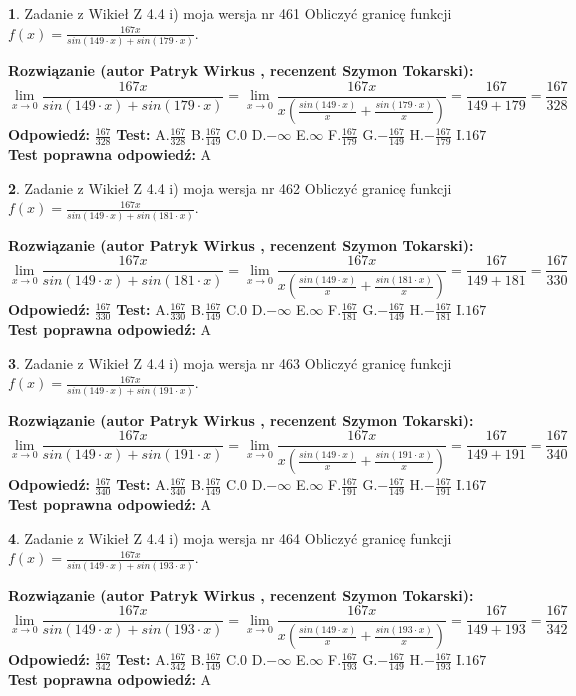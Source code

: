 \documentclass[12pt, a4paper]{article}
\theoremstyle{definition} %
\newtheorem{zad}{}
\newcommand{\zadStart}[1]{\begin{zad}#1\newline}
\newcommand{\zadStop}{\end{zad}}
\newcommand{\rozwStart}[2]{\noindent \textbf{Rozwiązanie (autor #1 , recenzent #2): }\newline}
\newcommand{\rozwStop}{\newline}
\newcommand{\odpStart}{\noindent \textbf{Odpowiedź:}\newline}
\newcommand{\odpStop}{\newline}
\newcommand{\testStart}{\noindent \textbf{Test:}\newline}
\newcommand{\testStop}{\newline}
\newcommand{\kluczStart}{\noindent \textbf{Test poprawna odpowiedź:}\newline}
\newcommand{\kluczStop}{\newline}
\begin{document}
\zadStart{Zadanie z Wikieł Z 4.4 i) moja wersja nr 461}
Obliczyć granicę funkcji $f(x)=\frac{167x}{sin(149\cdot x) +sin(179\cdot x)}$.
\zadStop
\rozwStart{Patryk Wirkus}{Szymon Tokarski}
$$\lim\limits_{x\to 0}\frac{167x}{sin(149\cdot x) +sin(179\cdot x)}=\lim\limits_{x\to 0}\frac{167x}{x(\frac{sin(149\cdot x)}{x}+\frac{sin(179\cdot x)}{x})}=\frac{167}{149+179} = \frac{167}{328}$$
\rozwStop
\odpStart
$\frac{167}{328}$
\odpStop
\testStart
A.$\frac{167}{328}$
B.$\frac{167}{149}$
C.$0$
D.$-\infty$
E.$\infty$
F.$\frac{167}{179}$
G.$-\frac{167}{149}$
H.$-\frac{167}{179}$
I.$167$
\testStop
\kluczStart
A
\kluczStop



\zadStart{Zadanie z Wikieł Z 4.4 i) moja wersja nr 462}
Obliczyć granicę funkcji $f(x)=\frac{167x}{sin(149\cdot x) +sin(181\cdot x)}$.
\zadStop
\rozwStart{Patryk Wirkus}{Szymon Tokarski}
$$\lim\limits_{x\to 0}\frac{167x}{sin(149\cdot x) +sin(181\cdot x)}=\lim\limits_{x\to 0}\frac{167x}{x(\frac{sin(149\cdot x)}{x}+\frac{sin(181\cdot x)}{x})}=\frac{167}{149+181} = \frac{167}{330}$$
\rozwStop
\odpStart
$\frac{167}{330}$
\odpStop
\testStart
A.$\frac{167}{330}$
B.$\frac{167}{149}$
C.$0$
D.$-\infty$
E.$\infty$
F.$\frac{167}{181}$
G.$-\frac{167}{149}$
H.$-\frac{167}{181}$
I.$167$
\testStop
\kluczStart
A
\kluczStop



\zadStart{Zadanie z Wikieł Z 4.4 i) moja wersja nr 463}
Obliczyć granicę funkcji $f(x)=\frac{167x}{sin(149\cdot x) +sin(191\cdot x)}$.
\zadStop
\rozwStart{Patryk Wirkus}{Szymon Tokarski}
$$\lim\limits_{x\to 0}\frac{167x}{sin(149\cdot x) +sin(191\cdot x)}=\lim\limits_{x\to 0}\frac{167x}{x(\frac{sin(149\cdot x)}{x}+\frac{sin(191\cdot x)}{x})}=\frac{167}{149+191} = \frac{167}{340}$$
\rozwStop
\odpStart
$\frac{167}{340}$
\odpStop
\testStart
A.$\frac{167}{340}$
B.$\frac{167}{149}$
C.$0$
D.$-\infty$
E.$\infty$
F.$\frac{167}{191}$
G.$-\frac{167}{149}$
H.$-\frac{167}{191}$
I.$167$
\testStop
\kluczStart
A
\kluczStop



\zadStart{Zadanie z Wikieł Z 4.4 i) moja wersja nr 464}
Obliczyć granicę funkcji $f(x)=\frac{167x}{sin(149\cdot x) +sin(193\cdot x)}$.
\zadStop
\rozwStart{Patryk Wirkus}{Szymon Tokarski}
$$\lim\limits_{x\to 0}\frac{167x}{sin(149\cdot x) +sin(193\cdot x)}=\lim\limits_{x\to 0}\frac{167x}{x(\frac{sin(149\cdot x)}{x}+\frac{sin(193\cdot x)}{x})}=\frac{167}{149+193} = \frac{167}{342}$$
\rozwStop
\odpStart
$\frac{167}{342}$
\odpStop
\testStart
A.$\frac{167}{342}$
B.$\frac{167}{149}$
C.$0$
D.$-\infty$
E.$\infty$
F.$\frac{167}{193}$
G.$-\frac{167}{149}$
H.$-\frac{167}{193}$
I.$167$
\testStop
\kluczStart
A
\kluczStop
\end{document}
